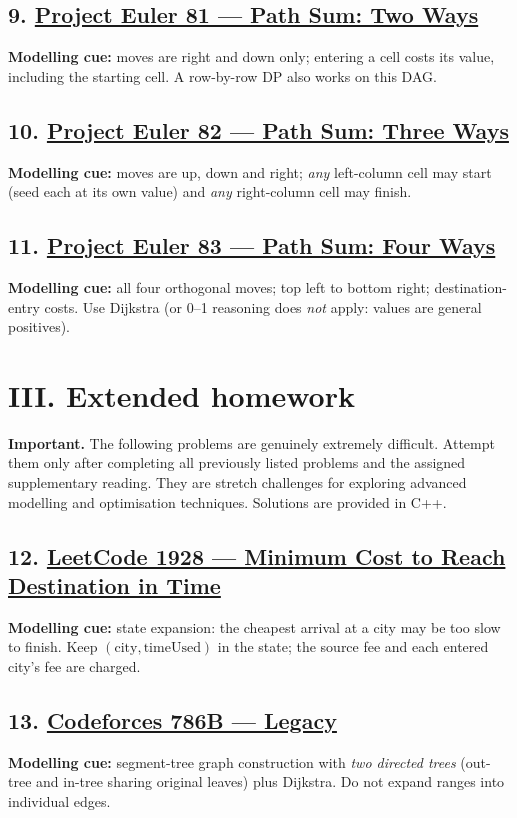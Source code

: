 \documentclass[12pt]{article}
\begin{document}
\subsection*{9. \href{https://projecteuler.net/problem=81}{Project Euler 81 --- Path Sum: Two Ways}}
\textbf{Modelling cue:} moves are right and down only; entering a cell costs its value, including the starting cell. A row-by-row DP also works on this DAG.

\subsection*{10. \href{https://projecteuler.net/problem=82}{Project Euler 82 --- Path Sum: Three Ways}}
\textbf{Modelling cue:} moves are up, down and right; \emph{any} left-column cell may start (seed each at its own value) and \emph{any} right-column cell may finish.

\subsection*{11. \href{https://projecteuler.net/problem=83}{Project Euler 83 --- Path Sum: Four Ways}}
\textbf{Modelling cue:} all four orthogonal moves; top left to bottom right; destination-entry costs. Use Dijkstra (or 0--1 reasoning does \emph{not} apply: values are general positives).

\section*{III. Extended homework}

\textbf{Important.} The following problems are genuinely extremely difficult. Attempt them only after completing all previously listed problems and the assigned supplementary reading. They are stretch challenges for exploring advanced modelling and optimisation techniques. Solutions are provided in C++.

\subsection*{12. \href{https://leetcode.com/problems/minimum-cost-to-reach-destination-in-time/}{LeetCode 1928 --- Minimum Cost to Reach Destination in Time}}
\textbf{Modelling cue:} state expansion: the cheapest arrival at a city may be too slow to finish. Keep $(\mathrm{city}, \mathrm{timeUsed})$ in the state; the source fee and each entered city's fee are charged.

\subsection*{13. \href{https://codeforces.com/problemset/problem/786/B}{Codeforces 786B --- Legacy}}
\textbf{Modelling cue:} segment-tree graph construction with \emph{two directed trees} (out-tree and in-tree sharing original leaves) plus Dijkstra. Do not expand ranges into individual edges.
\end{document}
